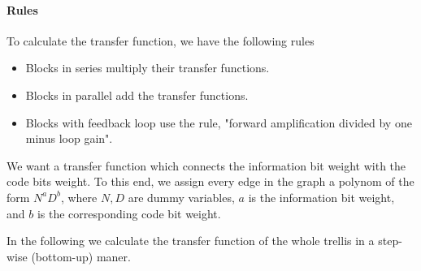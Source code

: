 \paragraph{Rules}

To calculate the transfer function, we have the following rules

\begin{itemize}

\item Blocks in series multiply their transfer functions.

\item Blocks in parallel add the transfer functions.

\item Blocks with feedback loop use the rule, "forward amplification divided by one minus loop gain".

\end{itemize}

We want a transfer function which connects the information bit weight with the code bits weight. To this end, we assign every edge in the graph a polynom of the form $N^a D^b$, where $N, D$ are dummy variables, $a$ is the information bit weight, and $b$ is the corresponding code bit weight.

\vspace*{7mm}


In the following we calculate the transfer function of the whole trellis in a step-wise (bottom-up) maner.

